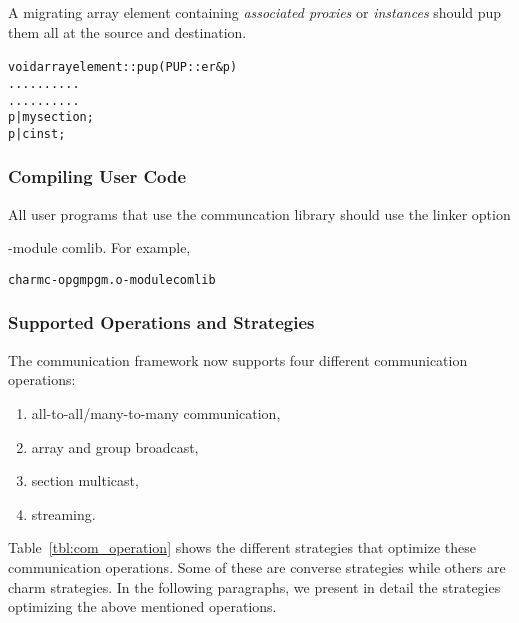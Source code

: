 A migrating array element containing {\em associated proxies} or {\em
instances} should pup them all at the source and destination.

\begin{alltt}
  void arrayelement::pup(PUP::er &p){
      ..........
      ..........
      p | mysection;
      p | cinst;
  }
\end{alltt}


\subsubsection{Compiling User Code}

All user programs that use the communcation library should use the
linker option {\textrm{-module comlib}. For example,
\begin{alltt}
charmc -o pgm pgm.o -module comlib
\end{alltt}


\subsubsection{Supported Operations and Strategies}

The communication framework now supports four different communication
operations:
\begin{enumerate}
\item all-to-all/many-to-many communication,
\item array and group broadcast,
\item section multicast,
\item streaming.
\end{enumerate}
Table~\ref{tbl:com_operation} shows the different strategies that optimize these
communication operations. Some of these are converse strategies while others are
charm strategies. In the following paragraphs, we present in detail the
strategies optimizing the above mentioned operations.

}
